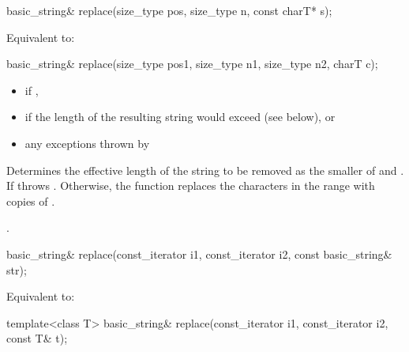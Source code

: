 %
\begin{itemdecl}
basic_string& replace(size_type pos, size_type n, const charT* s);
\end{itemdecl}

\begin{itemdescr}
\pnum
\effects Equivalent to: 
\end{itemdescr}

%
\begin{itemdecl}
basic_string& replace(size_type pos1, size_type n1, size_type n2, charT c);
\end{itemdecl}

\begin{itemdescr}
\pnum
\throws
\begin{itemize}
\item {} if ,
\item {} if the length of the resulting string
would exceed  (see below), or
\item any exceptions thrown by 
\end{itemize}

\pnum
\effects Determines the effective length  of the string to be
removed as the smaller of  and . If
  throws . Otherwise,
the function replaces the characters in the range
with  copies of .

\pnum
\returns {}.
\end{itemdescr}

%
\begin{itemdecl}
basic_string& replace(const_iterator i1, const_iterator i2, const basic_string& str);
\end{itemdecl}

\begin{itemdescr}
\pnum
\effects
Equivalent to: 
\end{itemdescr}

%
\begin{itemdecl}
template<class T>
  basic_string& replace(const_iterator i1, const_iterator i2, const T& t);
\end{itemdecl}

